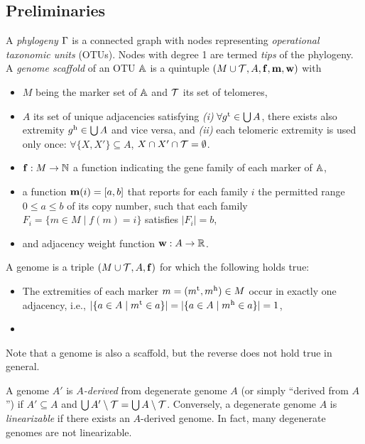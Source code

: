 \documentclass[runningheads]{llncs}
\begin{document}
\subsection{Preliminaries}
A \emph{phylogeny} $\Gamma$ is a connected graph with nodes representing \emph{operational taxonomic units} (OTUs). 
Nodes with degree 1 are termed \emph{tips} of the phylogeny.
A \emph{genome scaffold} of an OTU $\mathbb{A}$ is a quintuple $(M \cup \mathcal{T}, A, \mathbf{f}, \mathbf{m}, \mathbf{w})$ with 
\begin{itemize}
    \item $M$ being the marker set of $\mathbb{A}$ and $\mathcal{T}$ its set of telomeres,
    \item $A$ its set of unique adjacencies satisfying 
        \emph{(i)} $\forall g^{\textnormal{t}} \in \bigcup A$, there exists also extremity $g^{\textnormal{h}} \in \bigcup A$ and vice versa, and 
        \emph{(ii)} each telomeric extremity is used only once: $\forall \{X, X'\} \subseteq A$, $X \cap X' \cap \mathcal{T} = \emptyset$. 
    \item $\mathbf{f}: M \to \mathbb N$ a function indicating the gene family of each marker of $\mathbb{A}$,
    \item a function $\mathbf{m}(i) = [a, b]$ that reports for each family $i$ the permitted range $0 \leq a \leq b$ of its copy number, such that each family $F_i = \{m \in M \mid f(m) = i\}$ satisfies $|F_i| = b$, 
    \item and adjacency weight function $\mathbf{w}: A \to \mathbb R$.
\end{itemize}
A genome is a triple $(M \cup \mathcal{T}, A, \mathbf{f})$ for which the following holds true:
\begin{itemize}
    \item The extremities of each marker $m = (m^{\textnormal{t}}, m^{\textnormal{h}}) \in M$ occur in exactly one adjacency, i.e., $|\{ a \in A \mid m^{\textnormal{t}} \in a\}| = |\{ a \in A \mid m^{\textnormal{h}} \in a\}| = 1$,
    \item 
\end{itemize}
Note that a genome is also a scaffold, but the reverse does not hold true in general. 

A genome $A'$ is \emph{$A$-derived} from degenerate genome $A$ (or simply ``derived from $A$'') if $A' \subseteq A$ and $\bigcup A' \setminus \mathcal{T} = \bigcup A \setminus \mathcal{T}$. 
Conversely, a degenerate genome $A$ is \emph{linearizable} if there exists an $A$-derived genome. 
In fact, many degenerate genomes are not linearizable. 
\end{document}
